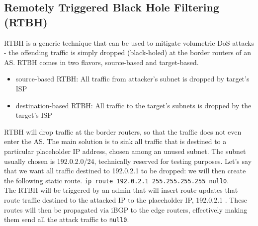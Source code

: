 \subsection{Remotely Triggered Black Hole Filtering (RTBH)}
RTBH is a generic technique that can be used to mitigate volumetric DoS attacks - the offending traffic is simply dropped (black-holed) at the border routers of an AS. RTBH comes in two flavors, source-based and target-based.

\begin{itemize}
	\item source-based RTBH: All traffic from attacker's subnet is dropped by target's ISP
	\item destination-based RTBH: All traffic to the target’s subnets is dropped by the target’s ISP\\
\end{itemize}

RTBH will drop traffic at the border routers, so that the traffic does not even enter the AS. The main solution is to sink all traffic that is destined to a particular placeholder IP address, chosen among an unused subnet. The subnet usually chosen is 192.0.2.0/24, technically reserved for testing purposes. Let’s say that we want all traffic destined to 192.0.2.1 to be dropped: we will then create the following static route. \texttt{ip route 192.0.2.1 255.255.255.255 null0}.\\
The RTBH will be triggered by an admin that will insert route updates that route traffic destined to the
attacked IP to the placeholder IP, 192.0.2.1 . These routes will then be propagated via iBGP to the edge routers, effectively making them send all the attack traffic to \texttt{null0}.





